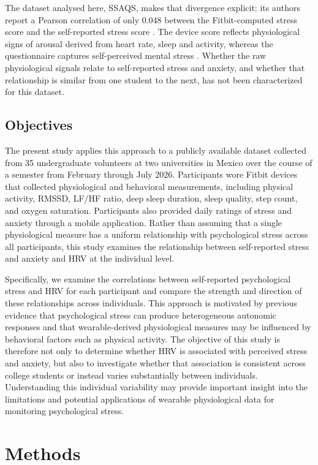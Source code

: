 \documentclass[11pt, a4paper, oneside]{article}
\begin{document}
The dataset analysed here, SSAQS, makes that divergence explicit: its authors report a Pearson correlation of only 0.048 between the Fitbit-computed stress score and the self-reported stress score \cite{reference 9}. The device score reflects physiological signs of arousal derived from heart rate, sleep and activity, whereas the questionnaire captures self-perceived mental stress \cite{reference 9}. Whether the raw physiological signals relate to self-reported stress and anxiety, and whether that relationship is similar from one student to the next, has not been characterized for this dataset.


\subsection{Objectives}
The present study applies this approach to a publicly available dataset collected from 35 undergraduate volunteers at two universities in Mexico over the course of a semester from February through July 2026. Participants wore Fitbit devices that collected physiological and behavioral measurements, including physical activity, RMSSD, LF/HF ratio, deep sleep duration, sleep quality, step count, and oxygen saturation. Participants also provided daily ratings of stress and anxiety through a mobile application. Rather than assuming that a single physiological measure has a uniform relationship with psychological stress across all participants, this study examines the relationship between self-reported stress and anxiety and HRV at the individual level.

Specifically, we examine the correlations between self-reported psychological stress and HRV for each participant and compare the strength and direction of these relationships across individuals. This approach is motivated by previous evidence that psychological stress can produce heterogeneous autonomic responses and that wearable-derived physiological measures may be influenced by behavioral factors such as physical activity. The objective of this study is therefore not only to determine whether HRV is associated with perceived stress and anxiety, but also to investigate whether that association is consistent across college students or instead varies substantially between individuals. Understanding this individual variability may provide important insight into the limitations and potential applications of wearable physiological data for monitoring psychological stress.

\section{Methods}
\end{document}
